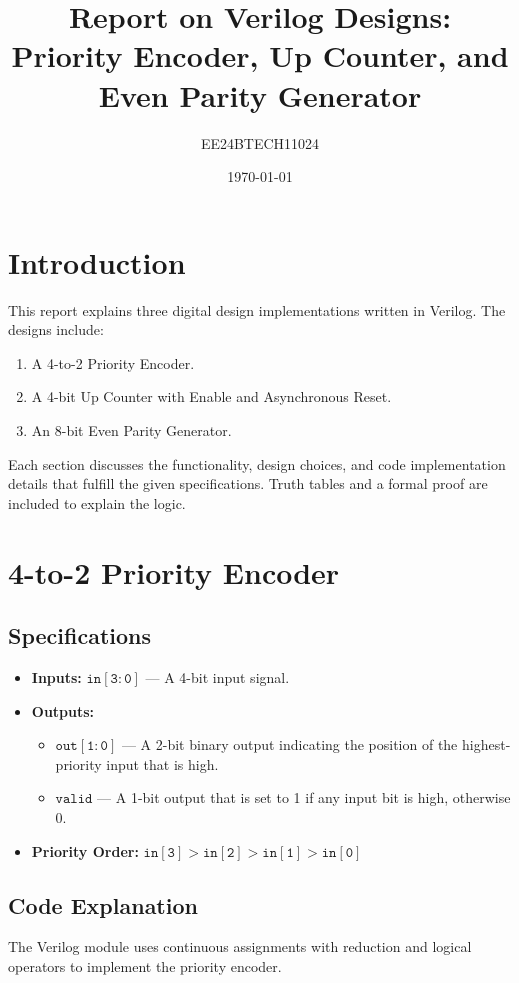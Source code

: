 \documentclass[11pt]{article}
\title{Report on Verilog Designs: Priority Encoder, Up Counter, and Even Parity Generator}
\author{EE24BTECH11024}
\date{\today}
\begin{document}
\maketitle

\section{Introduction}
This report explains three digital design implementations written in Verilog. The designs include:
\begin{enumerate}
    \item A 4-to-2 Priority Encoder.
    \item A 4-bit Up Counter with Enable and Asynchronous Reset.
    \item An 8-bit Even Parity Generator.
\end{enumerate}
Each section discusses the functionality, design choices, and code implementation details that fulfill the given specifications. Truth tables and a formal proof are included to explain the logic.

\section{4-to-2 Priority Encoder}

\subsection{Specifications}
\begin{itemize}
    \item \textbf{Inputs:} \(\mathtt{in[3:0]}\) --- A 4-bit input signal.
    \item \textbf{Outputs:}
    \begin{itemize}
        \item \(\mathtt{out[1:0]}\) --- A 2-bit binary output indicating the position of the highest-priority input that is high.
        \item \(\mathtt{valid}\) --- A 1-bit output that is set to 1 if any input bit is high, otherwise 0.
    \end{itemize}
    \item \textbf{Priority Order:} \(\mathtt{in[3] > in[2] > in[1] > in[0]}\)
\end{itemize}

\subsection{Code Explanation}
The Verilog module uses continuous assignments with reduction and logical operators to implement the priority encoder.
\end{document}
